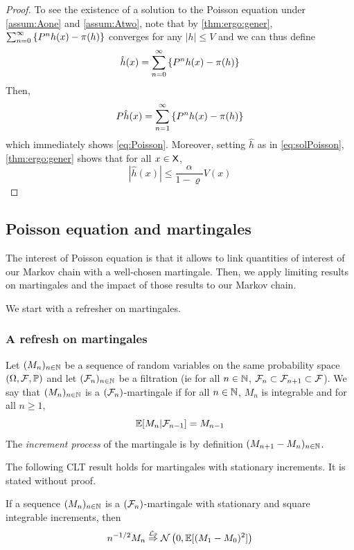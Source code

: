 \documentclass[english,graybox,envcountchap,envcountsame,sectrefs,shortlabels]{svmono}
\theoremstyle{style}
\newcommand{\dlim}[1]{\stackrel{\mathcal{L}_{#1}}{\Rightarrow}}
\newcommand{\gauss}{\mathcal{N}}
\begin{document}
 \begin{proof}
To see the existence of a solution to the Poisson equation under \ref{assum:Aone} and \ref{assum:Atwo}, note that by \autoref{thm:ergo:gener}, $\sum_{n=0}^\infty \left\{ P^n h(x)-\pi(h)\right\}$ converges for any $|h|\leq V$ and we can thus define
\begin{equation*}
\hat h(x)=\sum_{n=0}^\infty \left\{ P^n h(x)-\pi(h)\right\}
\end{equation*}
Then,
$$
P \hat h(x)=\sum_{n=1}^\infty \left\{ P^n h(x)-\pi(h)\right\}
$$
which immediately shows \eqref{eq:Poisson}. Moreover, setting $\hat h$ as in \eqref{eq:solPoisson}, \autoref{thm:ergo:gener} shows that for all $x\in\mathsf{X}$,
$$
|\hat h(x)|\leq \frac{\alpha}{1-\varrho} V(x)
$$
 \end{proof}




\subsection{Poisson equation and martingales}

The interest of Poisson equation is that it allows to link quantities of interest of our Markov chain with a well-chosen martingale. Then, we apply limiting results on martingales and the impact of those results to our Markov chain.

We start with a refresher on martingales.

\subsubsection{A refresh on martingales}
Let $(M_n)_{n \in \mathbb{N}}$ be a sequence of random variables on the same probability space $(\Omega,\mathcal{F},\mathbb{P})$ and let $(\mathcal{F}_n)_{n\in\mathbb{N}}$ be a filtration (ie for all $n\in\mathbb{N}$, $\mathcal{F}_n\subset \mathcal{F}_{n+1}\subset \mathcal{F}$). We say that $(M_n)_{n \in \mathbb{N}}$ is a {\rm $(\mathcal{F}_n)$-martingale} if for all $n\in\mathbb{N}$, $M_n$ is integrable and for all $n\geq 1$,
$$
\mathbb{E}[M_n|\mathcal{F}_{n-1}]=M_{n-1}
$$
The {\em increment process} of the martingale is by definition $(M_{n+1}-M_n)_{n\in\mathbb{N}}$.

The following CLT result holds for martingales with stationary increments. It is stated without proof.

\begin{theorem} \label{thm:clt:marting} 
If a sequence $(M_n)_{n \in \mathbb{N}}$ is a $(\mathcal{F}_n)$-martingale with stationary and square integrable increments, then
$$
  n^{-1/2} M_n \dlim{\PP} \gauss\lr{0,\PE[(M_1-M_0)^2]}
$$
\end{theorem}
\end{document}
